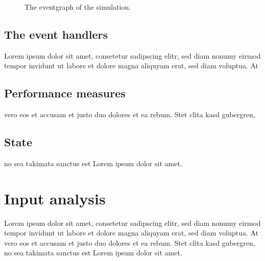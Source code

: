 \documentclass{article}
\begin{document}
\begin{figure}[H]
            \caption{The eventgraph of the simulation.}\label{fig:event-graph}
        \end{figure}

        \subsection{The event handlers}
            Lorem ipsum dolor sit amet, consetetur sadipscing elitr, sed diam nonumy eirmod
            tempor invidunt ut labore et dolore magna aliquyam erat, sed diam voluptua. At
        \subsection{Performance measures}
            vero eos et accusam et justo duo dolores et ea rebum. Stet clita kasd gubergren,
        \subsection{State}
            no sea takimata sanctus est Lorem ipsum dolor sit amet.
        
    

    \section{Input analysis}
        Lorem ipsum dolor sit amet, consetetur sadipscing elitr, sed diam nonumy eirmod
        tempor invidunt ut labore et dolore magna aliquyam erat, sed diam voluptua. At
        vero eos et accusam et justo duo dolores et ea rebum. Stet clita kasd gubergren,
        no sea takimata sanctus est Lorem ipsum dolor sit amet.
\end{document}
